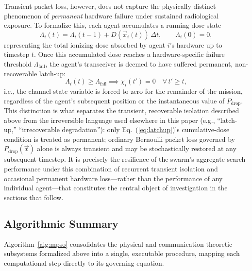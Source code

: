 \documentclass[journal]{IEEEtran}
\begin{document}
Transient packet loss, however, does not capture the physically distinct phenomenon of \emph{permanent} hardware failure under sustained radiological exposure. To formalize this, each agent accumulates a running dose state
\begin{equation}
\Lambda_i(t) = \Lambda_i(t-1) + D(\vec{x}_i(t))\,\Delta t, \qquad \Lambda_i(0) = 0,
\label{eq:cumdose}
\end{equation}
representing the total ionizing dose absorbed by agent $i$'s hardware up to timestep $t$. Once this accumulated dose reaches a hardware-specific failure threshold $\Lambda_{\text{fail}}$, the agent's transceiver is deemed to have suffered permanent, non-recoverable latch-up:
\begin{equation}
\Lambda_i(t) \ge \Lambda_{\text{fail}} \implies \chi_i(t') = 0 \quad \forall\, t' \ge t,
\label{eq:latchup}
\end{equation}
i.e., the channel-state variable is forced to zero for the remainder of the mission, regardless of the agent's subsequent position or the instantaneous value of $P_{\text{drop}}$. This distinction is what separates the transient, recoverable isolation described above from the irreversible language used elsewhere in this paper (e.g., ``latch-up,'' ``irrecoverable degradation''): only Eq.~(\ref{eq:latchup})'s cumulative-dose condition is treated as permanent; ordinary Bernoulli packet loss governed by $P_{\text{drop}}(\vec{x})$ alone is always transient and may be stochastically restored at any subsequent timestep. It is precisely the resilience of the swarm's aggregate search performance under this combination of recurrent transient isolation and occasional permanent hardware loss---rather than the performance of any individual agent---that constitutes the central object of investigation in the sections that follow.

\subsection{Algorithmic Summary}
\label{sec:algo-summary}

Algorithm~\ref{alg:mpso} consolidates the physical and communication-theoretic subsystems formalized above into a single, executable procedure, mapping each computational step directly to its governing equation.
\end{document}
